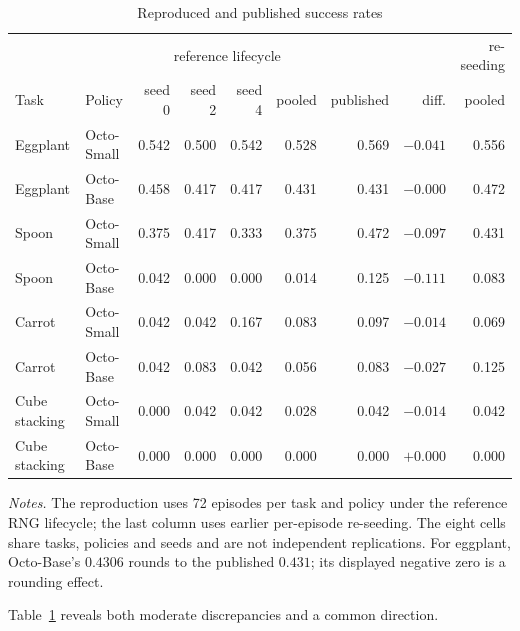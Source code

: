 \documentclass[pdflatex,iicol,sn-apa]{sn-jnl}
\theoremstyle{remark}
\newcommand{\tablenote}[1]{\par\vspace{4pt}\noindent
\begin{minipage}{\linewidth}\tablefootnotefont\raggedright #1\par\end{minipage}}
\begin{document}
\begin{table}[t]
\caption{Reproduced and published success rates}\label{tab4}
\begin{tabular}{@{}llrrrrrrr@{}}
\toprule
 & & \multicolumn{4}{c}{reference lifecycle} & & & re-seeding \\
\cmidrule(lr){3-6}
Task & Policy & seed 0 & seed 2 & seed 4 & pooled & published & diff. & pooled \\
\midrule
Eggplant & Octo-Small & 0.542 & 0.500 & 0.542 & 0.528 & 0.569 & $-0.041$ & 0.556 \\
Eggplant & Octo-Base & 0.458 & 0.417 & 0.417 & 0.431 & 0.431 & $-0.000$ & 0.472 \\
Spoon & Octo-Small & 0.375 & 0.417 & 0.333 & 0.375 & 0.472 & $-0.097$ & 0.431 \\
Spoon & Octo-Base & 0.042 & 0.000 & 0.000 & 0.014 & 0.125 & $-0.111$ & 0.083 \\
Carrot & Octo-Small & 0.042 & 0.042 & 0.167 & 0.083 & 0.097 & $-0.014$ & 0.069 \\
Carrot & Octo-Base & 0.042 & 0.083 & 0.042 & 0.056 & 0.083 & $-0.027$ & 0.125 \\
Cube stacking & Octo-Small & 0.000 & 0.042 & 0.042 & 0.028 & 0.042 & $-0.014$ & 0.042 \\
Cube stacking & Octo-Base & 0.000 & 0.000 & 0.000 & 0.000 & 0.000 & $+0.000$ & 0.000 \\
\bottomrule
\end{tabular}
\tablenote{\textit{Notes.} The reproduction uses 72 episodes per task and policy under the reference RNG lifecycle; the last column uses earlier per-episode re-seeding. The eight cells share tasks, policies and seeds and are not independent replications. For eggplant, Octo-Base's $0.4306$ rounds to the published $0.431$; its displayed negative zero is a rounding effect.}
\end{table}

Table~\ref{tab4} reveals both moderate discrepancies and a common direction.
\end{document}
